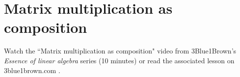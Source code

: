 \section{Matrix multiplication as composition}

Watch the ``Matrix multiplication as composition" video from 3Blue1Brown's
\textit{Essence of linear algebra} series (10 minutes) or read the associated
lesson on 3blue1brown.com
\cite{bib:3b1b_linalg_matrix_multiplication_as_composition}.
